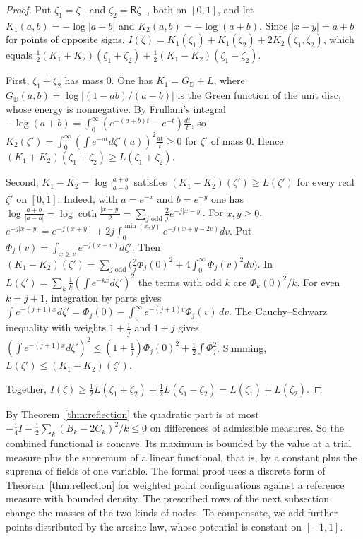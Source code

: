 \documentclass[11pt]{amsart}
\theoremstyle{definition}
\theoremstyle{remark}
\numberwithin{equation}{section}
\begin{document}
\begin{proof}
Put $\zeta_1=\zeta_+$ and $\zeta_2=\mathsf R\zeta_-$, both on $[0,1]$, and let $K_1(a,b)=-\log|a-b|$ and
$K_2(a,b)=-\log(a+b)$. Since $|x-y|=a+b$ for points of opposite signs,
$I(\zeta)=K_1(\zeta_1)+K_1(\zeta_2)+2K_2(\zeta_1,\zeta_2)$, which equals
$\frac12(K_1+K_2)(\zeta_1+\zeta_2)+\frac12(K_1-K_2)(\zeta_1-\zeta_2)$.

First, $\zeta_1+\zeta_2$ has mass $0$. One has $K_1=G_{\mathbb D}+L$, where
$G_{\mathbb D}(a,b)=\log|(1-ab)/(a-b)|$ is the Green function of the unit disc, whose energy is nonnegative.
By Frullani's integral $-\log(a+b)=\int_0^\infty(e^{-(a+b)t}-e^{-t})\frac{dt}t$, so
$K_2(\zeta')=\int_0^\infty(\int e^{-at}d\zeta'(a))^2\frac{dt}t\ge0$ for $\zeta'$ of mass $0$. Hence
$(K_1+K_2)(\zeta_1+\zeta_2)\ge L(\zeta_1+\zeta_2)$.

Second, $K_1-K_2=\log\frac{a+b}{|a-b|}$ satisfies $(K_1-K_2)(\zeta')\ge L(\zeta')$ for every real $\zeta'$ on
$[0,1]$. Indeed, with $a=e^{-x}$ and $b=e^{-y}$ one has $\log\frac{a+b}{|a-b|}=\log\coth\frac{|x-y|}2
=\sum_{j\text{ odd}}\frac2je^{-j|x-y|}$. For $x,y\ge0$,
$e^{-j|x-y|}=e^{-j(x+y)}+2j\int_0^{\min(x,y)}e^{-j(x+y-2v)}dv$. Put $\Phi_j(v)=\int_{x\ge v}e^{-j(x-v)}d\zeta'$.
Then $(K_1-K_2)(\zeta')=\sum_{j\text{ odd}}\bigl(\frac2j\Phi_j(0)^2+4\int_0^\infty\Phi_j(v)^2dv\bigr)$. In
$L(\zeta')=\sum_k\frac1k(\int e^{-kx}d\zeta')^2$ the terms with odd $k$ are $\Phi_k(0)^2/k$. For even $k=j+1$,
integration by parts gives $\int e^{-(j+1)x}d\zeta'=\Phi_j(0)-\int_0^\infty e^{-(j+1)v}\Phi_j(v)\,dv$. The
Cauchy--Schwarz inequality with weights $1+\frac1j$ and $1+j$ gives
$(\int e^{-(j+1)x}d\zeta')^2\le(1+\frac1j)\Phi_j(0)^2+\frac12\int\Phi_j^2$. Summing, $L(\zeta')\le(K_1-K_2)(\zeta')$.

Together, $I(\zeta)\ge\frac12L(\zeta_1+\zeta_2)+\frac12L(\zeta_1-\zeta_2)=L(\zeta_1)+L(\zeta_2)$.
\end{proof}

By Theorem~\ref{thm:reflection} the quadratic part is at most $-\frac14I-\frac12\sum_k(B_k-2C_k)^2/k\le0$ on
differences of admissible measures. So the combined functional is concave. Its maximum is bounded by the
value at a trial measure plus the supremum of a linear functional, that is, by a constant plus the suprema
of fields of one variable. The formal proof uses a discrete form of Theorem~\ref{thm:reflection} for weighted
point configurations against a reference measure with bounded density. The prescribed rows of the next
subsection change the masses of the two kinds of nodes. To compensate, we add further points distributed by
the arcsine law, whose potential is constant on $[-1,1]$.
\end{document}
